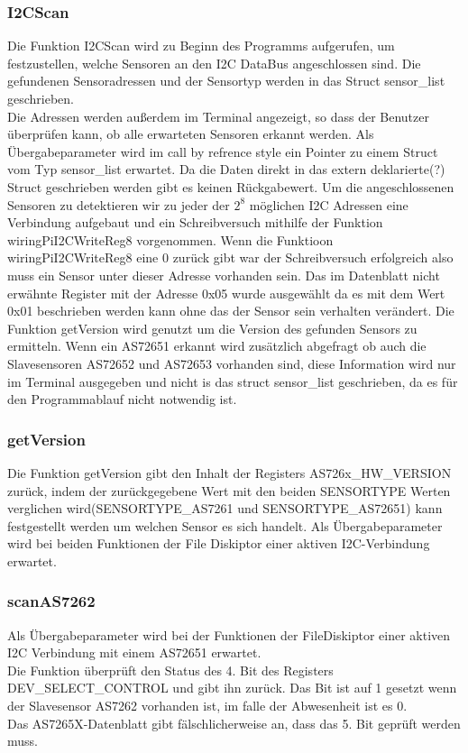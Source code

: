 \subsubsection{I2CScan}
Die Funktion I2CScan wird zu Beginn des Programms aufgerufen, um festzustellen, welche Sensoren an den I2C DataBus angeschlossen sind.
Die gefundenen Sensoradressen und der Sensortyp werden in das Struct sensor\_list geschrieben.\\
Die Adressen werden außerdem im Terminal angezeigt, so dass der Benutzer überprüfen kann, ob alle erwarteten Sensoren erkannt werden.
Als Übergabeparameter wird im call by refrence style ein Pointer zu einem Struct vom Typ sensor\_list erwartet.
Da die Daten direkt in das extern deklarierte(?) Struct geschrieben werden gibt es keinen Rückgabewert.
Um die angeschlossenen Sensoren zu detektieren wir zu jeder der $2^8$ möglichen I2C Adressen eine Verbindung aufgebaut und ein Schreibversuch mithilfe der Funktion wiringPiI2CWriteReg8 vorgenommen.
Wenn die Funktioon wiringPiI2CWriteReg8 eine 0 zurück gibt war der Schreibversuch erfolgreich also muss ein Sensor unter dieser Adresse vorhanden sein.
Das im Datenblatt nicht erwähnte Register mit der Adresse 0x05 wurde ausgewählt da es mit dem Wert 0x01 beschrieben werden kann ohne das der Sensor sein verhalten verändert.
Die Funktion getVersion wird genutzt um die Version des gefunden Sensors zu ermitteln.
Wenn ein AS72651 erkannt wird zusätzlich abgefragt ob auch die Slavesensoren AS72652 und AS72653 vorhanden sind, diese Information wird nur im Terminal ausgegeben und nicht is das struct sensor\_list geschrieben, da es für den Programmablauf nicht notwendig ist.
\subsubsection{getVersion}
Die Funktion getVersion gibt den Inhalt der Registers AS726x\_HW\_VERSION zurück, indem der zurückgegebene Wert mit den beiden SENSORTYPE Werten verglichen wird(SENSORTYPE\_AS7261 und SENSORTYPE\_AS72651) kann festgestellt werden um welchen Sensor es sich handelt. 
Als Übergabeparameter wird bei beiden Funktionen der File Diskiptor einer aktiven I2C-Verbindung erwartet.\\

\subsubsection{scanAS7262}
Als Übergabeparameter wird bei der Funktionen der FileDiskiptor einer aktiven I2C Verbindung mit einem AS72651 erwartet.\\
Die Funktion überprüft den Status des 4. Bit des Registers DEV\_SELECT\_CONTROL und gibt ihn zurück. Das Bit ist auf 1 gesetzt wenn der Slavesensor AS7262 vorhanden ist, im falle der Abwesenheit ist es 0.\\
Das AS7265X-Datenblatt gibt fälschlicherweise an, dass das 5. Bit geprüft werden muss.\\

